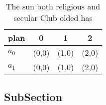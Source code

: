 \documentclass[a4paper]{article}
\begin{document}
\begin{table}
\begin{adjustbox}{width=0.6\columnwidth}
\begin{tabular}{|l|l|l|l|}
\hline
\textbf{plan} & \multicolumn{1}{c|}{\textbf{0}} & \multicolumn{1}{c|}{\textbf{1}} & \multicolumn{1}{c|}{\textbf{2}} \\ \hline
\textbf{$a_0$}  & (0,0) & (1,0) & (2,0) \\ \hline
\textbf{$a_1$}  & (0,0) & (1,0) & (2,0) \\ \hline
\end{tabular}
\end{adjustbox}
\caption{The sun both religious and secular Club olded has
}
\end{table}

\subsection{SubSection}
\end{document}
